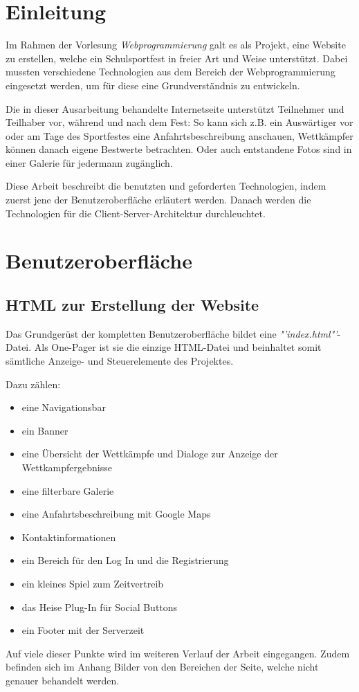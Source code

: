 \chapter{Einleitung}
\label{Einleitung}
Im Rahmen der Vorlesung \textit{Webprogrammierung} galt es als Projekt, eine Website zu erstellen, welche ein Schulsportfest in freier Art und Weise unterstützt. Dabei mussten verschiedene Technologien aus dem Bereich der Webprogrammierung eingesetzt werden, um für diese eine Grundverständnis zu entwickeln.
\par
Die in dieser Ausarbeitung behandelte Internetseite unterstützt Teilnehmer und Teilhaber vor, während und nach dem Fest: So kann sich z.B. ein Auswärtiger vor oder am Tage des Sportfestes eine Anfahrtsbeschreibung anschauen, Wettkämpfer können danach eigene Bestwerte betrachten. Oder auch entstandene Fotos sind in einer Galerie für jedermann zugänglich.
\par
Diese Arbeit beschreibt die benutzten und geforderten Technologien, indem zuerst jene der Benutzeroberfläche erläutert werden. Danach werden die Technologien für die Client-Server-Architektur durchleuchtet.

\chapter{Benutzeroberfläche}
\label{Benutzeroberfläche}

\section{HTML zur Erstellung der Website}
\label{HTML zur Erstellung der Website}
Das Grundgerüst der kompletten Benutzeroberfläche bildet eine \textit{"'index.html"'}-Datei. Als One-Pager ist sie die einzige HTML-Datei und beinhaltet somit sämtliche Anzeige- und Steuerelemente des Projektes.
\par
Dazu zählen:
\begin{itemize}
	\item eine Navigationsbar
	\item ein Banner
	\item eine Übersicht der Wettkämpfe und Dialoge zur Anzeige der Wettkampfergebnisse
	\item eine filterbare Galerie
	\item eine Anfahrtsbeschreibung mit Google Maps
	\item Kontaktinformationen
	\item ein Bereich für den Log In und die Registrierung \item ein kleines Spiel zum Zeitvertreib
	\item das Heise Plug-In für Social Buttons
	\item ein Footer mit der Serverzeit	
\end{itemize}
Auf viele dieser Punkte wird im weiteren Verlauf der Arbeit eingegangen. Zudem befinden sich im Anhang Bilder von den Bereichen der Seite, welche nicht genauer behandelt werden.

